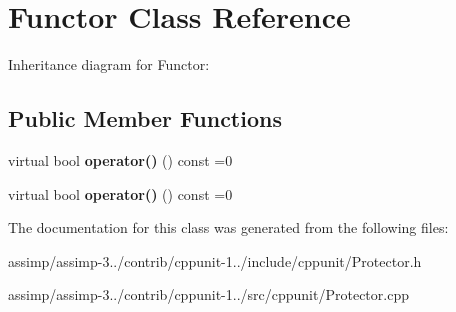 \hypertarget{class_functor}{\section{Functor Class Reference}
\label{class_functor}
}


Inheritance diagram for Functor\+:
\subsection*{Public Member Functions}
\begin{DoxyCompactItemize}
\item 
\hypertarget{class_functor_a075ab7f3b1e7ace202e650670556acbd}{virtual bool {\bfseries operator()} () const =0}\label{class_functor_a075ab7f3b1e7ace202e650670556acbd}

\item 
\hypertarget{class_functor_a075ab7f3b1e7ace202e650670556acbd}{virtual bool {\bfseries operator()} () const =0}\label{class_functor_a075ab7f3b1e7ace202e650670556acbd}

\end{DoxyCompactItemize}


The documentation for this class was generated from the following files\+:\begin{DoxyCompactItemize}
\item 
assimp/assimp-\/3../contrib/cppunit-\/1../include/cppunit/Protector.\+h\item 
assimp/assimp-\/3../contrib/cppunit-\/1../src/cppunit/Protector.\+cpp\end{DoxyCompactItemize}
